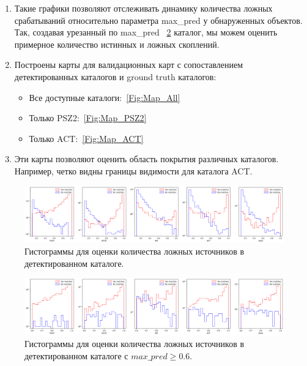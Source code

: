 \documentclass{article}
\begin{document}
\begin{enumerate}
\begin{itemize}
        \end{itemize}
    \item Такие графики позволяют отслеживать динамику количества ложных срабатываний относительно 
        параметра max\_pred у обнаруженных объектов. Так, создавая урезанный по max\_pred  
        ~\ref{Fig:Hist6} каталог, мы можем оценить примерное количество истинных и ложных 
        скоплений.\\
    \item Построены карты для валидационных карт с сопоставлением детектированных каталогов и 
        ground truth каталогов:\\
        \begin{itemize}
            \item Все доступные каталоги:~\ref{Fig:Map_All}\\
            \item Только PSZ2:~\ref{Fig:Map_PSZ2}\\
            \item Только ACT:~\ref{Fig:Map_ACT}{}\\
        \end{itemize}
    \item Эти карты позволяют оценить область покрытия различных каталогов. Например, четко видны 
        границы видимости для каталога ACT.\\
\end{enumerate}




\begin{figure}[h]
\includegraphics[width=\linewidth]{2circles_histogram}
\caption{Гистограммы для оценки количества ложных источников в детектированном каталоге.}
\label{Fig:Hist}
\end{figure}

\begin{figure}[h]
\includegraphics[width=\linewidth]{2circles_histogram_06}
\caption{Гистограммы для оценки количества ложных источников в детектированном каталоге с 
    $max\_pred \geqslant 0.6$.}
\label{Fig:Hist6}
\end{figure}
\end{document}
